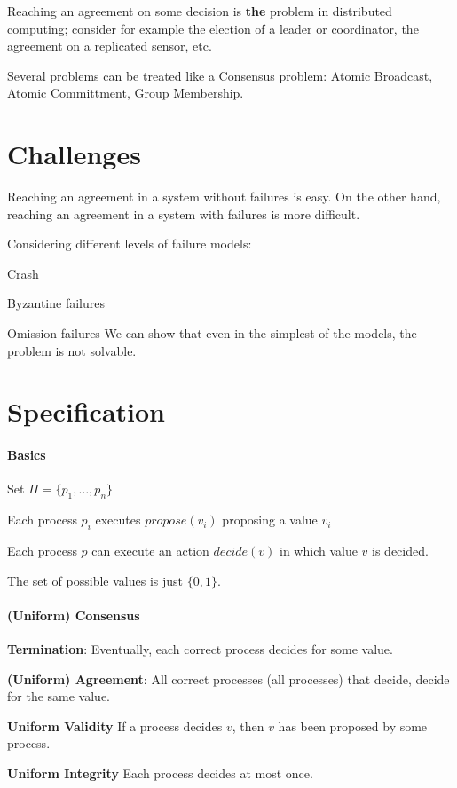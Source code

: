 \documentclass[12pt]{article}
\newcommand{\propose}{\mathit{propose}}
\newcommand{\decide}{\mathit{decide}}
\begin{document}
Reaching an agreement on some decision is {\bf the} problem in distributed
computing; consider for example the election of a leader or coordinator, the
agreement on a replicated sensor, etc.

Several problems can be treated like a Consensus problem: Atomic Broadcast, 
Atomic Committment, Group Membership.

\section*{Challenges}

Reaching an agreement in a system without failures is easy. 
On the other hand, reaching an agreement in a system with failures is
more difficult.

Considering different levels of failure models:
\BI
\item Crash
\item Byzantine failures
\item Omission failures
\EI
We can show that even in the simplest of the models, the problem is
not solvable.

\section*{Specification}

\paragraph{Basics}
\BI
\item Set $\Pi = \{ p_1, \ldots, p_n \}$
\item Each process $p_i$ executes $\propose(v_i)$ proposing a value $v_i$
\item Each process $p$ can execute an action $\decide(v)$ in which value
  $v$ is decided.
\item The set of possible values is just $\{ 0, 1\}$.
\EI

\paragraph{(Uniform) Consensus}
\BI
\item {\bf Termination}: Eventually, each correct process decides for some
  value.
\item {\bf (Uniform) Agreement}: All correct processes (all processes) that 
  decide, decide for the same value.
\item {\bf Uniform Validity}
  If a process decides $v$, then $v$ has been proposed by some process.
\item {\bf Uniform Integrity}
  Each process decides at most once.
\EI
\end{document}
